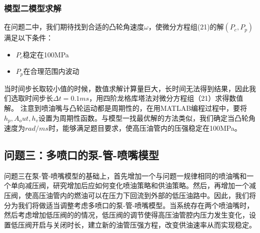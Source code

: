 \documentclass[withoutpreface,bwprint]{cumcmthesis} %
\begin{document}
			\subsubsection{模型二模型求解}
			在问题二中，我们期待找到合适的凸轮角速度$\omega$，使微分方程组(21)的解$(P_c,P_p)$满足以下条件：
			\begin{itemize}
				\item $P_c$稳定在100MPa
				\item $P_p$在合理范围内波动
			\end{itemize}
		
			当时间步长取较小值的时候，数值求解计算量巨大，长时间无法得到结果，因此我们选取时间步长$\Delta t = 0.1ms$，用四阶龙格库塔法对微分方程组（21）求得数值解。
			注意到喷油嘴与凸轮运动都是周期性的，在用MATLAB编程过程中，要将$h_p,A_out,h_v$设置为周期性函数。与模型一找最优解的方法类似，我们确定当凸轮角速度为$rad/ms$时，能够满足题目要求，使高压油管内的压强稳定在100MPa。
						
			\subsection{问题三：多喷口的泵­-管-­喷嘴模型}
			问题三在泵-管-喷嘴模型的基础上，首先增加一个与问题一规律相同的喷油嘴和一个单向减压阀，研究增加后应如何变化喷油策略和供油策略。然后，再增加一个减压阀，使高压油管内的燃油可以在压力下回流到外部的低压油路中。因此，我们将分为我们将做适当调整考虑多喷口的泵-管-喷嘴模型。当系统存在两个喷油嘴时，然后考虑增加低压阀的的情况，低压阀的调节使得高压油管腔内压力发生变化，设置低压阀开启与关闭时长，建立新的油管压强方程，改变供油速率从而实现稳定。
			
\end{document}
